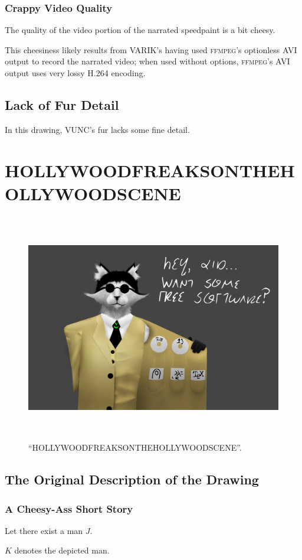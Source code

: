 \documentclass{report}
\newcommand\imageheight{10cm}
\begin{document}
\subsection{Crappy Video Quality}
The quality of the video portion of the narrated speedpaint is a bit cheesy.

This cheesiness likely results from VARIK's having used \textsc{ffmpeg}'s optionless AVI output to record the narrated video; when used without options, \textsc{ffmpeg}'s AVI output uses very lossy H.264 encoding.
\section{Lack of Fur Detail}
In this drawing, VUNC's fur lacks some fine detail.
\chapter{HOLLYWOODFREAKSONTHEHOLLYWOODSCENE}
\begin{figure}[ht]
	\centering
	\includegraphics[height=\imageheight]{hollywoodfreaksonthehollywoodscene/hollywoodfreaksonthehollywoodscene.png}
	\caption[center]{``HOLLYWOODFREAKSONTHEHOLLYWOODSCENE''.}
\end{figure}
\section{The Original Description of the Drawing}
\subsection{A Cheesy-Ass Short Story}
Let there exist a man $J$.

$K$ denotes the depicted man.
\end{document}
